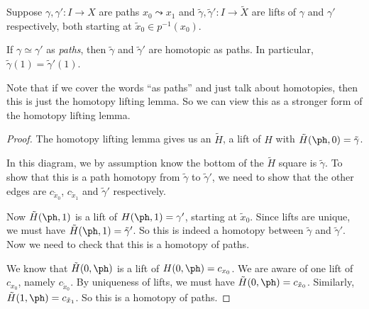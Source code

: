 \documentclass[a4paper]{article}
\begin{document}
\begin{cor}
  Suppose $\gamma, \gamma': I\to X$ are paths $x_0 \leadsto x_1$ and $\tilde{\gamma}, \tilde{\gamma}': I\to \tilde{X}$ are lifts of $\gamma$ and $\gamma'$ respectively, both starting at $\tilde{x}_0 \in p^{-1}(x_0)$.

  If $\gamma\simeq \gamma'$ as \emph{paths}, then $\tilde{\gamma}$ and $\tilde{\gamma}'$ are homotopic as paths. In particular, $\tilde{\gamma}(1) = \tilde{\gamma}'(1)$.
\end{cor}
Note that if we cover the words ``as paths'' and just talk about homotopies, then this is just the homotopy lifting lemma. So we can view this as a stronger form of the homotopy lifting lemma.

\begin{proof}
  The homotopy lifting lemma gives us an $\tilde{H}$, a lift of $H$ with $\tilde{H}(\ph, 0) = \tilde{\gamma}$.
  \begin{center}
  \end{center}
  In this diagram, we by assumption know the bottom of the $\tilde{H}$ square is $\tilde{\gamma}$. To show that this is a path homotopy from $\tilde{\gamma}$ to $\tilde{\gamma}'$, we need to show that the other edges are $c_{\tilde{x}_0}$, $c_{\tilde{x}_1}$ and $\tilde{\gamma}'$ respectively.

  Now $\tilde{H}(\ph, 1)$ is a lift of $H(\ph, 1) = \gamma'$, starting at $\tilde{x}_0$. Since lifts are unique, we must have $\tilde{H}(\ph, 1) = \tilde{\gamma}'$. So this is indeed a homotopy between $\tilde{\gamma}$ and $\tilde{\gamma}'$. Now we need to check that this is a homotopy of paths.

  We know that $\tilde{H}(0, \ph)$ is a lift of $H(0, \ph) = c_{x_0}$. We are aware of one lift of $c_{x_0}$, namely $c_{\tilde{x}_0}$. By uniqueness of lifts, we must have $\tilde{H}(0, \ph) = c_{\tilde{x}_0}$. Similarly, $\tilde{H}(1, \ph) = c_{\tilde{x}_1}$. So this is a homotopy of paths.
\end{proof}
\end{document}
